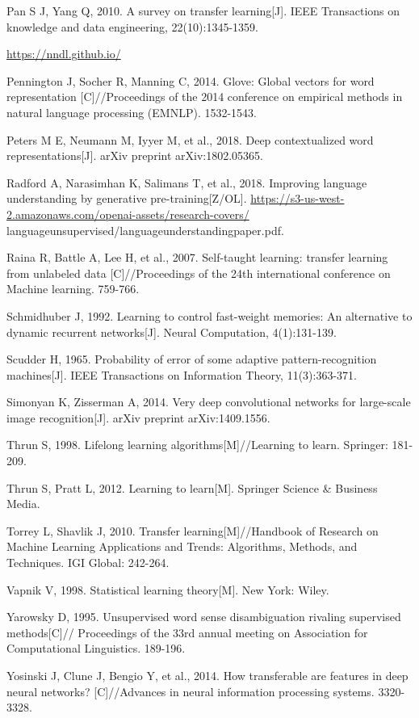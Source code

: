 \documentclass[10pt]{article}
\begin{document}
Pan S J, Yang Q, 2010. A survey on transfer learning[J]. IEEE Transactions on knowledge and data engineering, 22(10):1345-1359.

\href{https://nndl.github.io/}{https://nndl.github.io/}

Pennington J, Socher R, Manning C, 2014. Glove: Global vectors for word representation [C]//Proceedings of the 2014 conference on empirical methods in natural language processing (EMNLP). 1532-1543.

Peters M E, Neumann M, Iyyer M, et al., 2018. Deep contextualized word representations[J]. arXiv preprint arXiv:1802.05365.

Radford A, Narasimhan K, Salimans T, et al., 2018. Improving language understanding by generative pre-training[Z/OL]. \href{https://s3-us-west-2.amazonaws.com/openai-assets/research-covers/}{https://s3-us-west-2.amazonaws.com/openai-assets/research-covers/} languageunsupervised/languageunderstandingpaper.pdf.

Raina R, Battle A, Lee H, et al., 2007. Self-taught learning: transfer learning from unlabeled data [C]//Proceedings of the 24th international conference on Machine learning. 759-766.

Schmidhuber J, 1992. Learning to control fast-weight memories: An alternative to dynamic recurrent networks[J]. Neural Computation, 4(1):131-139.

Scudder H, 1965. Probability of error of some adaptive pattern-recognition machines[J]. IEEE Transactions on Information Theory, 11(3):363-371.

Simonyan K, Zisserman A, 2014. Very deep convolutional networks for large-scale image recognition[J]. arXiv preprint arXiv:1409.1556.

Thrun S, 1998. Lifelong learning algorithms[M]//Learning to learn. Springer: 181-209.

Thrun S, Pratt L, 2012. Learning to learn[M]. Springer Science \& Business Media.

Torrey L, Shavlik J, 2010. Transfer learning[M]//Handbook of Research on Machine Learning Applications and Trends: Algorithms, Methods, and Techniques. IGI Global: 242-264.

Vapnik V, 1998. Statistical learning theory[M]. New York: Wiley.

Yarowsky D, 1995. Unsupervised word sense disambiguation rivaling supervised methods[C]// Proceedings of the 33rd annual meeting on Association for Computational Linguistics. 189-196.

Yosinski J, Clune J, Bengio Y, et al., 2014. How transferable are features in deep neural networks? [C]//Advances in neural information processing systems. 3320-3328.
\end{document}
